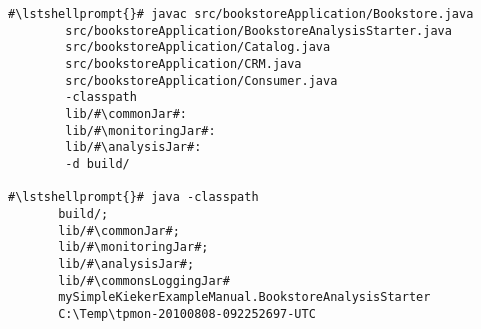 \begin{lstlisting}[caption=Compile and run under Windows,label=lst:bookstoreAnalysisStarterWin] 			
#\lstshellprompt{}# javac src/bookstoreApplication/Bookstore.java 
        src/bookstoreApplication/BookstoreAnalysisStarter.java 
        src/bookstoreApplication/Catalog.java 
        src/bookstoreApplication/CRM.java 
        src/bookstoreApplication/Consumer.java
        -classpath
        lib/#\commonJar#:
        lib/#\monitoringJar#:
        lib/#\analysisJar#:
        -d build/

#\lstshellprompt{}# java -classpath 
       build/;
       lib/#\commonJar#;
       lib/#\monitoringJar#;
       lib/#\analysisJar#;
       lib/#\commonsLoggingJar#
       mySimpleKiekerExampleManual.BookstoreAnalysisStarter 
       C:\Temp\tpmon-20100808-092252697-UTC
\end{lstlisting}	
